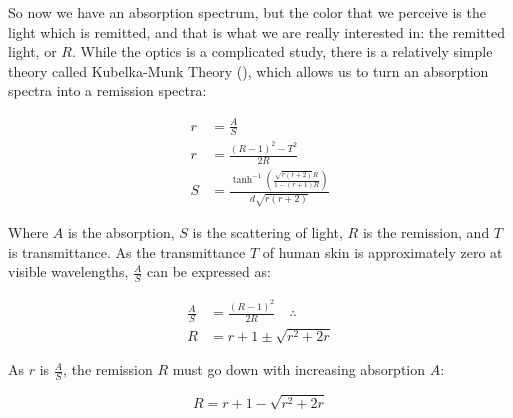 So now we have an absorption spectrum, but the color that we perceive is the light which is remitted, and that is what we are really interested in: the remitted light, or $R$. While the optics is a complicated study, there is a relatively simple theory called Kubelka-Munk Theory (\cite{Kubelka1931,Kubelka:48,Kubelka:54}), which allows us to turn an absorption spectra into a remission spectra:

\begin{align}\label{eq:KubelkaMunk}
r &=\frac{A}{S} \\
r & =\frac{(R-1)^2-T^2}{2 R} \\
S & =\frac{\tanh ^{-1}\left(\frac{\sqrt{r (r+2)} R}{1-(r+1) R}\right)}{d \sqrt{r (r+2)}}
\end{align}

Where $A$ is the absorption, $S$ is the scattering of light, $R$ is the remission, and $T$ is transmittance. As the transmittance $T$ of human skin is approximately zero at visible wavelengths, $\frac{A}{S}$ can be expressed as:

\begin{align}\label{eq:KubelkaMunk2}
\frac{A}{S} &=\frac{(R-1)^2}{2 R} \quad \therefore\\
R &= r+1 \pm \sqrt{r^2+2 r}
\end{align}

As $r$ is $\frac{A}{S}$, the remission $R$ must go down with increasing absorption $A$:

\begin{equation}\label{eq:KubelkaMunk3}
R = r+1 - \sqrt{r^2+2 r}
\end{equation}

